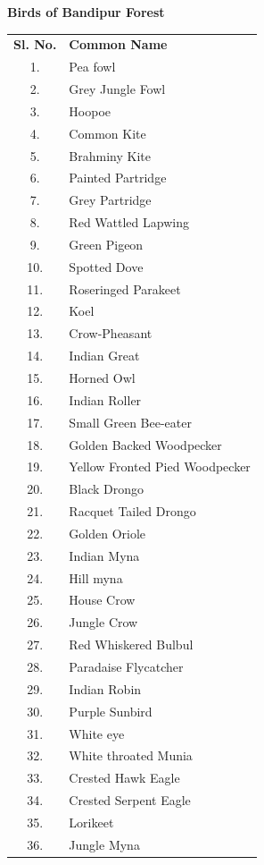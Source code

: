 \begin{center}
\smallskip
\textbf{Birds of Bandipur Forest}
\end{center}
{\renewcommand{\arraystretch}{1.05}
\begin{longtable}{cl}
\textbf{Sl. No.} & \textbf{Common Name}\\
1.  &Pea fowl \\
2.  &Grey Jungle Fowl \\
3.  &Hoopoe \\
4. &Common Kite \\
5.	&Brahminy Kite \\
6. &  Painted Partridge \\
7.&  Grey Partridge \\
8.&	Red Wattled Lapwing \\
9.&	Green Pigeon \\
10.& Spotted Dove \\
11.	& Roseringed Parakeet \\
12.	&Koel \\
13.	& Crow-Pheasant \\
14.	& Indian Great \\
15.	& Horned Owl \\
16.	& Indian Roller \\
17.	& Small Green Bee-eater \\
18.	& Golden Backed Woodpecker\\ 
19.	& Yellow Fronted Pied Woodpecker \\
20.	& Black Drongo \\
21.	& Racquet Tailed Drongo \\
22.	& Golden Oriole \\
23.	& Indian Myna \\
24.	&  Hill myna \\
25.	& House Crow \\
26.	& Jungle Crow \\
27.	& Red Whiskered Bulbul \\
28.	& Paradaise Flycatcher \\
29.	& Indian Robin \\
30.	& Purple Sunbird \\
31.	& White eye \\
32.	& White throated Munia \\
33.	& Crested Hawk Eagle \\
34.	& Crested Serpent Eagle\\ 
35.	& Lorikeet \\
36.	& Jungle Myna \\

\end{longtable}}
